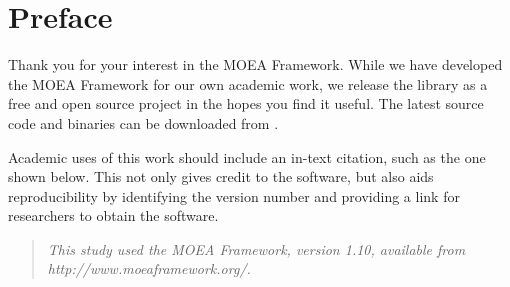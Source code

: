 \chapter*{Preface}

Thank you for your interest in the MOEA Framework.  While we have developed the MOEA Framework for our own academic work, we release the library as a free and open source project in the hopes you find it useful.  The latest source code and binaries can be downloaded from .

Academic uses of this work should include an in-text citation, such as the one shown below.  This not only gives credit to the software, but also aids reproducibility by identifying the version number and providing a link for researchers to obtain the software.

\begin{quote}
  \textit{This study used the MOEA Framework, version 1.10, available from http://www.moeaframework.org/.}
\end{quote}